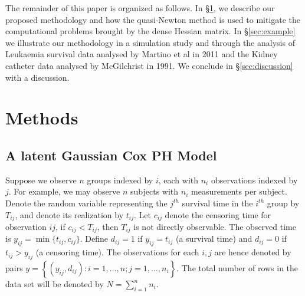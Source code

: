 \documentclass[serif,10pt]{wiley-article}
\begin{document}
The remainder of this paper is organized as follows. In \S\ref{sec:method}, we describe our proposed methodology and how the quasi-Newton method is used to mitigate the computational problems brought by the dense Hessian matrix. In \S\ref{sec:example} we illustrate our methodology in a simulation study and through the analysis of Leukaemia survival data analysed by Martino et al in 2011 \cite{inlacoxph} and the Kidney catheter data analysed by McGilchrist \cite{kidney} in 1991. We conclude in \S\ref{sec:discussion} with a discussion.


\section{Methods}\label{sec:method}

\subsection{A latent Gaussian Cox PH Model}

Suppose we observe $n$ groups indexed by $i$, each with $n_{i}$ observations indexed by $j$. For example, we may observe $n$ subjects with $n_{i}$ measurements per subject. Denote the random variable representing the $j^{th}$ survival time in the $i^{th}$ group by $T_{ij}$, and denote its realization by $t_{ij}$. Let $c_{ij}$ denote the censoring time for observation $ij$, if $c_{ij} < T_{ij}$, then $T_{ij}$ is not directly observable. The observed time is $y_{ij} = \min\{t_{ij},c_{ij}\}$. Define $d_{ij} = 1$ if $y_{ij} = t_{ij}$ (a survival time) and $d_{ij} = 0$ if $t_{ij} > y_{ij}$ (a censoring time). The observations for each $i,j$ are hence denoted by pairs $y =  \left\{(y_{ij},d_{ij}): i = 1,\ldots,n; j = 1,\ldots,n_{i} \right\}$. The total number of rows in the data set will be denoted by $N = \sum_{i=1}^{n}n_{i}$.
\end{document}
